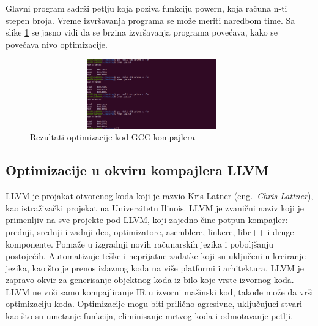 \documentclass[a4paper]{article}
\begin{document}
Glavni program sadrži petlju koja poziva funkciju powern, koja računa n-ti stepen broja. Vreme izvršavanja programa se može meriti naredbom time. Sa slike \ref{fig:Rezultati_optimizacije} se jasno vidi da se brzina izvršavanja programa povećava, kako se povećava nivo optimizacije.

\begin{figure}[h!]
    \begin{center}
        \includegraphics[width=105mm, height=30mm]{pics/test.png}
    \end{center}
    \caption {Rezultati optimizacije kod GCC kompajlera}
    \label{fig:Rezultati_optimizacije}

\end{figure}


\subsection{Optimizacije u okviru kompajlera LLVM}
\label{subsec:optimizacijeLLVM}

LLVM je projakat otvorenog koda koji je razvio Kris Latner (eng.~{\em Chris Lattner}), kao istraživački projekat na Univerzitetu Ilinois. LLVM je zvanični naziv koji je primenljiv na sve projekte pod LLVM, koji zajedno čine potpun kompajler: prednji, srednji i zadnji deo, optimizatore, asemblere, linkere, libc++ i druge komponente. Pomaže u izgradnji novih računarskih jezika i poboljšanju postojećih. Automatizuje teške i neprijatne zadatke koji su uključeni u kreiranje jezika, kao što je prenos izlaznog koda na više platformi i arhitektura, LLVM je zapravo okvir za generisanje objektnog koda iz bilo koje vrste izvornog koda. LLVM ne vrši samo kompajliranje IR u izvorni mašinski kod, takođe može da vrši optimizaciju koda. Optimizacije mogu biti prilično agresivne, uključujuci stvari kao što su umetanje funkcija, eliminisanje mrtvog koda i odmotavanje petlji. \cite{llvm1} \cite{gccVsClang}
\end{document}
